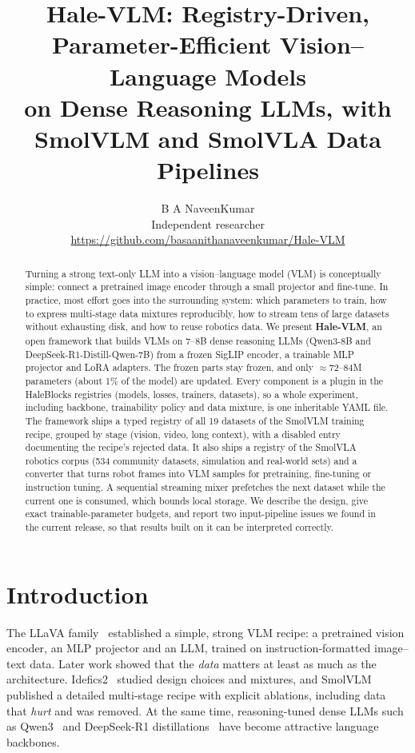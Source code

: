 \documentclass[11pt]{article}
\title{\textbf{Hale-VLM: Registry-Driven, Parameter-Efficient Vision--Language Models\\on Dense Reasoning LLMs, with SmolVLM and SmolVLA Data Pipelines}}
\author{B A NaveenKumar\\
\small Independent researcher\\
\small \url{https://github.com/basaanithanaveenkumar/Hale-VLM}}
\date{}
\begin{document}
\maketitle

\begin{abstract}
Turning a strong text-only LLM into a vision--language model (VLM) is conceptually simple:
connect a pretrained image encoder through a small projector and fine-tune. In practice,
most effort goes into the surrounding system: which parameters to train, how to express
multi-stage data mixtures reproducibly, how to stream tens of large datasets without
exhausting disk, and how to reuse robotics data. We present \textbf{Hale-VLM}, an
open framework that builds VLMs on 7--8B dense reasoning LLMs (Qwen3-8B and
DeepSeek-R1-Distill-Qwen-7B) from a frozen SigLIP encoder, a trainable MLP projector and
LoRA adapters. The frozen parts stay frozen, and only $\approx$72--84M parameters (about 1\%
of the model) are updated. Every component is a plugin in the HaleBlocks registries
(models, losses, trainers, datasets), so a whole experiment, including backbone,
trainability policy and data mixture, is one inheritable YAML file. The framework ships a
typed registry of all 19 datasets of the SmolVLM training recipe, grouped by stage
(vision, video, long context), with a disabled entry documenting the recipe's rejected
data. It also ships a registry of the SmolVLA robotics corpus (534 community datasets,
simulation and real-world sets) and a converter that turns robot frames into VLM samples
for pretraining, fine-tuning or instruction tuning. A sequential streaming mixer prefetches
the next dataset while the current one is consumed, which bounds local storage. We
describe the design, give exact trainable-parameter budgets, and report two input-pipeline
issues we found in the current release, so that results built on it can be interpreted
correctly.
\end{abstract}

\section{Introduction}

The LLaVA family~\cite{liu2023llava,liu2024llava15} established a simple, strong VLM
recipe: a pretrained vision encoder, an MLP projector and an LLM, trained on
instruction-formatted image--text data. Later work showed that the \emph{data} matters at
least as much as the architecture. Idefics2~\cite{laurencon2024matters} studied design
choices and mixtures, and SmolVLM~\cite{marafioti2025smolvlm} published a detailed
multi-stage recipe with explicit ablations, including data that \emph{hurt} and was
removed. At the same time, reasoning-tuned dense LLMs such as Qwen3~\cite{qwen3} and
DeepSeek-R1 distillations~\cite{deepseekr1} have become attractive language backbones.
\end{document}
